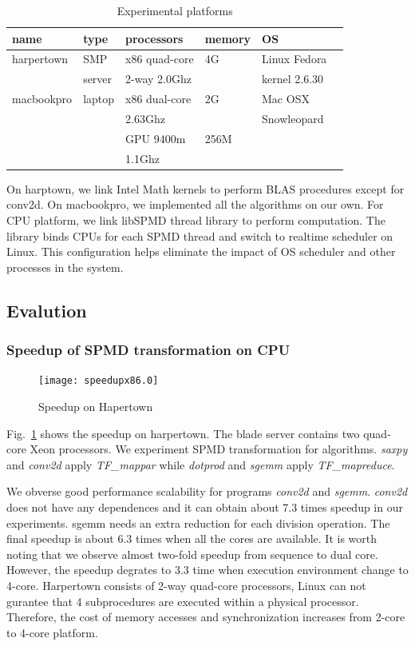 \documentclass[10pt, conference, compsocconf]{IEEEtran}
\begin{document}
\begin{table}[hbt]
\caption{Experimental platforms}\label{tbl:mach}
\begin{center}
\begin{tabular}{|l|l|l|l|l|r|}
\hline
\textbf{name}&\textbf{type}&\textbf{processors}&\textbf{memory}&\textbf{OS}\\
\hline
harpertown&SMP &x86 quad-core  &4G&Linux Fedora\\
                  &  server &   
2-way  2.0Ghz & &kernel 2.6.30\\
\hline
macbookpro&laptop &x86 dual-core &2G&Mac OSX\\
                    &           & 2.63Ghz         &  &Snowleopard\\
                   &           &GPU 9400m    &256M & \\
                    &           & 1.1Ghz   & &\\
\hline
\end{tabular} 
\end{center}
\end{table}
On harptown, we link Intel Math kernels to perform BLAS procedures
except for conv2d. On macbookpro, we implemented all the algorithms on
our own. For CPU platform, we link libSPMD thread library to
perform computation. The library binds CPUs for each SPMD
thread and switch to realtime scheduler on Linux.  This configuration
helps eliminate the impact of OS scheduler and other processes in the system.
\subsection{Evalution}
\subsubsection{Speedup of SPMD transformation on CPU}
\begin{figure}
\texttt{[image: speedupx86.0]}
\caption{Speedup on Hapertown}\label{fig:spdx86}
\end{figure}

Fig.~\ref{fig:spdx86} shows the speedup on harpertown. The blade
server contains two quad-core Xeon
processors. We experiment SPMD transformation for algorithms. \textit{saxpy} and
\textit{conv2d} apply  \emph{TF\_mappar} while \textit{dotprod} and \textit{sgemm} apply \emph{TF\_mapreduce}.

We obverse good performance scalability for programs
\textit{conv2d} and \textit{sgemm}. \textit{conv2d} does not have any dependences
and it can obtain about 7.3 times speedup in our experiments. sgemm
needs an extra reduction for each division operation. The final
speedup is about 6.3 times when all the cores are available. It is worth noting that we
observe almost two-fold speedup from sequence to dual core. However,
the speedup degrates to 3.3 time when execution
environment change to 4-core. Harpertown consists of  2-way quad-core processors,  Linux
can not gurantee that 4 subprocedures are executed within a physical
processor. Therefore, the cost of memory accesses and synchronization
increases from 2-core to 4-core platform. 
\end{document}
